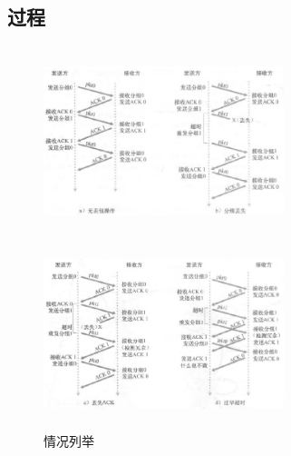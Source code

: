 \documentclass[UTF8,14pt]{article}
\numberwithin{figure}{section}
\begin{document}
\subsection{过程}
\vspace{-0.5cm}
\begin{figure}[!htbp]
      \centering
      \begin{minipage}[!ht]{0.49\textwidth}
            \centering
            \includegraphics[width=7cm,height=5.5cm]{figures/abp1_2.png}
      \end{minipage}
      \begin{minipage}[!ht]{0.49\textwidth}
            \centering
            \includegraphics[width=7cm,height=5.5cm]{figures/abp1_3.png}
      \end{minipage}
      \caption{情况列举}
\end{figure}
\end{document}
